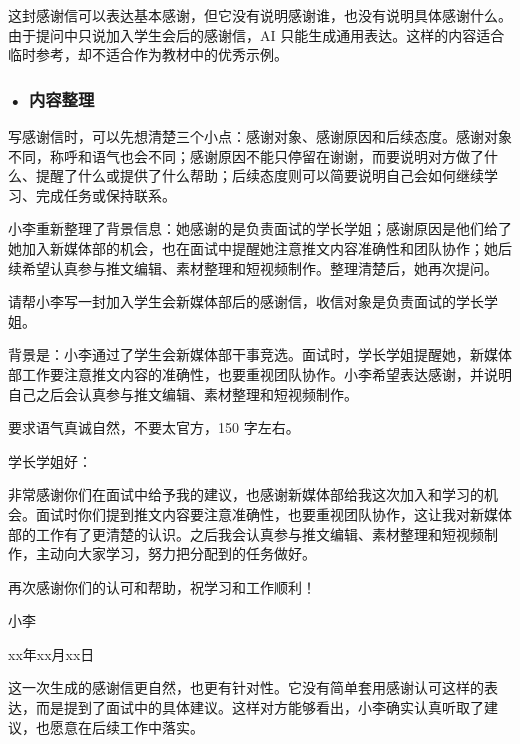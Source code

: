 这封感谢信可以表达基本感谢，但它没有说明感谢谁，也没有说明具体感谢什么。由于提问中只说加入学生会后的感谢信，AI 只能生成通用表达。这样的内容适合临时参考，却不适合作为教材中的优秀示例。

\subsubsection*{\textbf{• 内容整理}}

写感谢信时，可以先想清楚三个小点：感谢对象、感谢原因和后续态度。感谢对象不同，称呼和语气也会不同；感谢原因不能只停留在谢谢，而要说明对方做了什么、提醒了什么或提供了什么帮助；后续态度则可以简要说明自己会如何继续学习、完成任务或保持联系。

小李重新整理了背景信息：她感谢的是负责面试的学长学姐；感谢原因是他们给了她加入新媒体部的机会，也在面试中提醒她注意推文内容准确性和团队协作；她后续希望认真参与推文编辑、素材整理和短视频制作。整理清楚后，她再次提问。

\begin{userbox}
请帮小李写一封加入学生会新媒体部后的感谢信，收信对象是负责面试的学长学姐。

背景是：小李通过了学生会新媒体部干事竞选。面试时，学长学姐提醒她，新媒体部工作要注意推文内容的准确性，也要重视团队协作。小李希望表达感谢，并说明自己之后会认真参与推文编辑、素材整理和短视频制作。

要求语气真诚自然，不要太官方，150 字左右。
\end{userbox}

\begin{aibox}
\noindent 学长学姐好：

\par\qquad 非常感谢你们在面试中给予我的建议，也感谢新媒体部给我这次加入和学习的机会。面试时你们提到推文内容要注意准确性，也要重视团队协作，这让我对新媒体部的工作有了更清楚的认识。之后我会认真参与推文编辑、素材整理和短视频制作，主动向大家学习，努力把分配到的任务做好。

\par\qquad 再次感谢你们的认可和帮助，祝学习和工作顺利！

\par\hfill 小李

\par\hfill xx年xx月xx日
\end{aibox}

这一次生成的感谢信更自然，也更有针对性。它没有简单套用感谢认可这样的表达，而是提到了面试中的具体建议。这样对方能够看出，小李确实认真听取了建议，也愿意在后续工作中落实。

